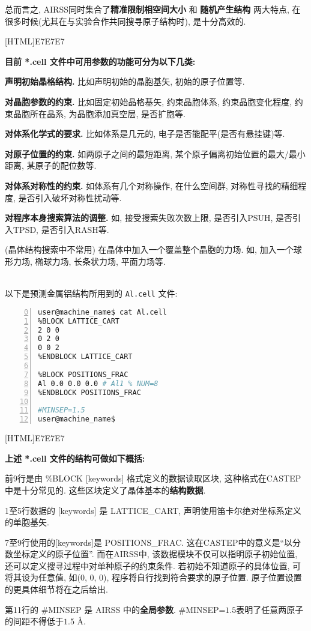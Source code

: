 \documentclass[a4paper, 10pt]{article}
\begin{document}
总而言之, AIRSS同时集合了\textbf{精准限制相空间大小} 和 \textbf{随机产生结构} 两大特点, 在很多时候(尤其在与实验合作共同搜寻原子结构时), 是十分高效的.

\noindent{}[HTML]{E7E7E7}{\parbox{\textwidth}{%
\noindent \textbf{目前 *.cell 文件中可用参数的功能可分为以下几类:}
\begin{maineu}
  \item \textbf{声明初始晶格结构.} 比如声明初始的晶胞基矢, 初始的原子位置等.
  \item \textbf{对晶胞参数的约束.} 比如固定初始晶格基矢, 约束晶胞体系, 约束晶胞变化程度, 约束晶胞所在晶系, 为晶胞添加真空层, 是否扩胞等.
  \item \textbf{对体系化学式的要求.} 比如体系是几元的, 电子是否能配平(是否有悬挂键)等.
  \item \textbf{对原子位置的约束.} 如两原子之间的最短距离, 某个原子偏离初始位置的最大/最小距离, 某原子的配位数等. 
  \item \textbf{对体系对称性的约束.} 如体系有几个对称操作, 在什么空间群, 对称性寻找的精细程度, 是否引入破坏对称性扰动等.
  \item \textbf{对程序本身搜索算法的调整.} 如, 接受搜索失败次数上限, 是否引入PSUH, 是否引入TPSD, 是否引入RASH等.
  \item (晶体结构搜索中不常用) 在晶体中加入一个覆盖整个晶胞的力场. 如, 加入一个球形力场, 椭球力场, 长条状力场, 平面力场等.
\end{maineu}}}\\

以下是预测金属铝结构所用到的 \verb|Al.cell| 文件:
\begin{lstlisting}[language={bash},numbers=left,firstnumber=0]
user@machine_name$ cat Al.cell
%BLOCK LATTICE_CART
2 0 0
0 2 0
0 0 2 
%ENDBLOCK LATTICE_CART

%BLOCK POSITIONS_FRAC
Al 0.0 0.0 0.0 # Al1 % NUM=8
%ENDBLOCK POSITIONS_FRAC

#MINSEP=1.5
user@machine_name$
\end{lstlisting}


\noindent{}[HTML]{E7E7E7}{\parbox{\textwidth}{%
\noindent \textbf{上述 *.cell 文件的结构可做如下概括:}
\begin{maineu}
  \item 前9行是由 \%BLOCK [keywords] 格式定义的数据读取区块, 这种格式在CASTEP中是十分常见的. 这些区块定义了晶体基本的\textbf{结构数据}.   
  \item 1至5行数据的 [keywords] 是 LATTICE\_CART, 声明使用笛卡尔绝对坐标系定义的单胞基矢. 
  \item 7至9行使用的[keywords]是 POSITIONS\_FRAC. 这在CASTEP中的意义是``以分数坐标定义的原子位置''. 而在AIRSS中, 该数据模块不仅可以指明原子初始位置, 还可以定义搜寻过程中对单种原子的约束条件. 若初始不知道原子的具体位置, 可将其设为任意值, 如(0, 0, 0), 程序将自行找到符合要求的原子位置. 原子位置设置的更具体细节将在之后给出. 
  \item 第11行的 \#MINSEP 是 AIRSS 中的\textbf{全局参数}. \#MINSEP=\(1.5\)表明了任意两原子的间距不得低于\(1.5\) \r{A}.
\end{maineu}}}\\
\end{document}
